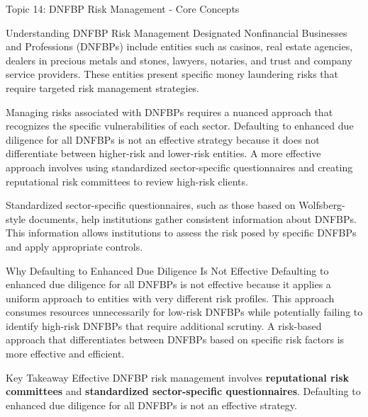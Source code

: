 \documentclass[5pt]{beamer}
\begin{document}
	\begin{frame}{Topic 14: DNFBP Risk Management - Core Concepts}
		\begin{block}{\tiny Understanding DNFBP Risk Management}
			\tiny Designated Nonfinancial Businesses and Professions (DNFBPs) include entities such as casinos, real estate agencies, dealers in precious metals and stones, lawyers, notaries, and trust and company service providers. These entities present specific money laundering risks that require targeted risk management strategies.
			
			Managing risks associated with DNFBPs requires a nuanced approach that recognizes the specific vulnerabilities of each sector. Defaulting to enhanced due diligence for all DNFBPs is not an effective strategy because it does not differentiate between higher-risk and lower-risk entities. A more effective approach involves using standardized sector-specific questionnaires and creating reputational risk committees to review high-risk clients.
			
			Standardized sector-specific questionnaires, such as those based on Wolfsberg-style documents, help institutions gather consistent information about DNFBPs. This information allows institutions to assess the risk posed by specific DNFBPs and apply appropriate controls.
		\end{block}
		
		\begin{block}{\tiny Why Defaulting to Enhanced Due Diligence Is Not Effective}
			\tiny Defaulting to enhanced due diligence for all DNFBPs is not effective because it applies a uniform approach to entities with very different risk profiles. This approach consumes resources unnecessarily for low-risk DNFBPs while potentially failing to identify high-risk DNFBPs that require additional scrutiny. A risk-based approach that differentiates between DNFBPs based on specific risk factors is more effective and efficient.
		\end{block}
		
		\begin{alertblock}{Key Takeaway}
			\tiny Effective DNFBP risk management involves \textbf{reputational risk committees} and \textbf{standardized sector-specific questionnaires}. Defaulting to enhanced due diligence for all DNFBPs is not an effective strategy.
		\end{alertblock}
	\end{frame}
	
\end{document}
